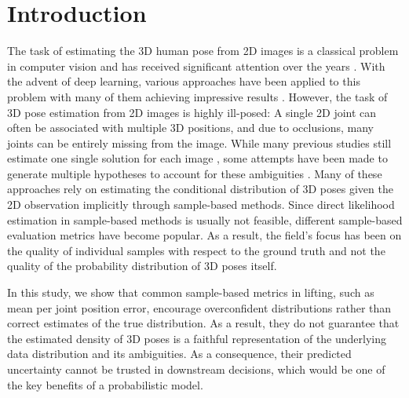 \documentclass{article} \usepackage{iclr2023_conference,times}
\begin{document}
\section{Introduction}
The task of estimating the 3D human pose from 2D images is a classical problem in computer vision and has received significant attention over the years \citep{Agarwal2004-nc, Mori2006-gp, Bo2008-rg}.
With the advent of deep learning, various approaches have been applied to this problem with many of them achieving impressive results \citep{martinez_2017_3dbaseline, Pavlakos2016-zj, Pavlakos2018-jw, zhaoCVPR19semantic, Zou2021-nz}. 
However, the task of 3D pose estimation from 2D images is highly ill-posed: A single 2D joint can often be associated with multiple 3D positions, and due to occlusions, many joints can be entirely missing from the image.
While many previous studies still estimate one single solution for each image \citep{martinez_2017_3dbaseline, pavlakos2017harvesting, sun2017compositional, zhaoCVPR19semantic, Zhang2021DeepM3}, some attempts have been made to generate multiple hypotheses to account for these ambiguities \citep{Li_Hee_Lee_2019, Sharma_Varigonda_Bindal_Sharma_Jain_2019, Wehrbein_Rudolph_Rosenhahn_Wandt_2021, Oikarinen_Hannah_Kazerounian_2020, li2020weakly}.
Many of these approaches rely on estimating the conditional distribution of 3D poses given the 2D observation implicitly through sample-based methods.
Since direct likelihood estimation in sample-based methods is usually not feasible, different sample-based evaluation metrics have become popular.
As a result, the field's focus has been on the quality of individual samples with respect to the ground truth and not the quality of the probability distribution of 3D poses itself.

In this study, we show that common sample-based metrics in lifting, such as mean per joint position error,  encourage overconfident distributions rather than correct estimates of the true distribution.
As a result, they do not guarantee that the estimated density of 3D poses is a faithful representation of the underlying data distribution and its ambiguities.
As a consequence, their predicted uncertainty cannot be trusted in downstream decisions, which would be one of the key benefits of a probabilistic model.  
\end{document}
